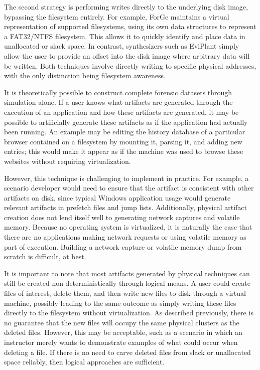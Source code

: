 \documentclass[letterpaper,12pt]{report}
\begin{document}
The second strategy is performing writes directly to the underlying disk
image, bypassing the filesystem entirely. For example, ForGe
\cite{vistiAutomaticCreationComputer2015} maintains a virtual
representation of supported filesystems, using its own data structures
to represent a FAT32/NTFS filesystem. This allows it to quickly identify
and place data in unallocated or slack space. In contrast, synthesizers
such as EviPlant \cite{scanlonEviPlantEfficientDigital2017} simply
allow the user to provide an offset into the disk image where arbitrary
data will be written. Both techniques involve directly writing to
specific physical addresses, with the only distinction being filesystem
awareness. ~

It is theoretically possible to construct complete forensic datasets
through simulation alone. If a user knows what artifacts are generated
through the execution of an application and how these artifacts are
generated, it may be possible to artificially generate these artifacts
as if the application had actually been running. An example may be
editing the history database of a particular browser contained on a
filesystem by mounting it, parsing it, and adding new entries; this
would make it appear as if the machine was used to browse these websites
without requiring virtualization.

However, this technique is challenging to implement in practice. For
example, a scenario developer would need to ensure that the artifact is
consistent with other artifacts on disk, since typical Windows
application usage would generate relevant artifacts in prefetch files
and jump lists. Additionally, physical artifact creation does not lend
itself well to generating network captures and volatile memory. Because
no operating system is virtualized, it is naturally the case that there
are no applications making network requests or using volatile memory as
part of execution. Building a network capture or volatile memory dump
from scratch is difficult, at best. ~

It is important to note that most artifacts generated by physical
techniques can still be created non-deterministically through logical
means. A user could create files of interest, delete them, and then
write new files to disk through a virtual machine, possibly leading to
the same outcome as simply writing these files directly to the
filesystem without virtualization. As described previously, there is no
guarantee that the new files will occupy the same physical clusters as
the deleted files. However, this may be acceptable, such as a scenario
in which an instructor merely wants to demonstrate examples of what
could occur when deleting a file. If there is no need to carve deleted
files from slack or unallocated space reliably, then logical approaches
are sufficient.
\end{document}
